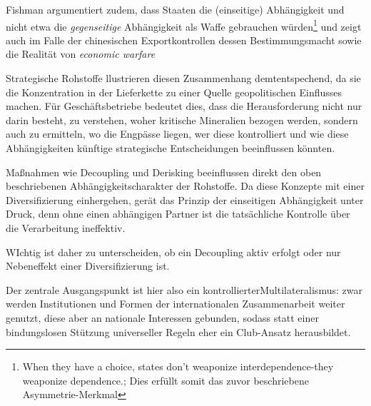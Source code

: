 \documentclass[12pt,a4paper,oneside]{book} %
\begin{document}
{Fishman argumentiert zudem, dass Staaten die (einseitige) Abhängigkeit und nicht etwa die \textit{gegenseitige} Abhängigkeit als Waffe gebrauchen würden\footnote{\glqq When they have a choice, states don't weaponize interdependence-they weaponize dependence.\grqq; Dies erfüllt somit das zuvor beschriebene Asymmetrie-Merkmal} und zeigt auch im Falle der chinesischen Exportkontrollen dessen Bestimmungsmacht sowie die Realität von \textit{economic warfare}

Strategische Rohstoffe llustrieren diesen Zusammenhang demtentspechend, da sie die Konzentration in der Lieferkette zu einer Quelle geopolitischen Einflusses machen. Für Geschäftsbetriebe bedeutet dies, dass die Herausforderung nicht nur darin besteht, zu verstehen, woher kritische Mineralien bezogen werden, sondern auch zu ermitteln, wo die Engpässe liegen, wer diese kontrolliert und wie diese Abhängigkeiten künftige strategische Entscheidungen beeinflussen könnten.

	
	Maßnahmen wie Decoupling und Derisking beeinflussen direkt den oben beschriebenen Abhängigkeitscharakter der Rohstoffe. Da diese Konzepte mit einer Diversifizierung einhergehen, gerät das Prinzip der einseitigen Abhängigkeit unter Druck, denn ohne einen abhängigen Partner ist die tatsächliche Kontrolle über die Verarbeitung ineffektiv.
	
	WIchtig ist daher zu unterscheiden, ob ein Decoupling aktiv erfolgt oder nur Nebeneffekt einer Diversifizierung ist.
	
	Der zentrale Ausgangspunkt ist hier also ein \glqq kontrollierter\grqq Multilateralismus: zwar werden Institutionen und Formen der internationalen Zusammenarbeit weiter genutzt, diese aber an nationale Interessen gebunden, sodass statt einer bindungslosen Stützung universeller Regeln eher ein Club-Ansatz herausbildet.

	
}
\end{document}
